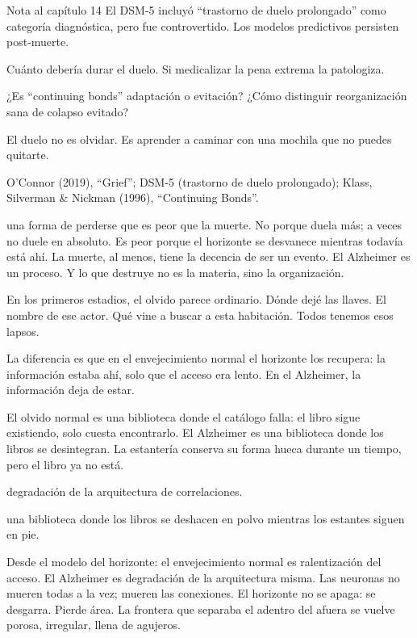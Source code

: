 \begin{notacap}{Nota al capítulo 14}
 El DSM-5 incluyó “trastorno de duelo prolongado” como categoría diagnóstica, pero fue controvertido. Los modelos predictivos persisten post-muerte.

 Cuánto debería durar el duelo. Si medicalizar la pena extrema la patologiza.

 ¿Es “continuing bonds” adaptación o evitación? ¿Cómo distinguir reorganización sana de colapso evitado?

 El duelo no es olvidar. Es aprender a caminar con una mochila que no puedes quitarte.

 O’Connor (2019), “Grief”; DSM-5 (trastorno de duelo prolongado); Klass, Silverman \& Nickman (1996), “Continuing Bonds”.
\end{notacap}
\noindent {} una forma de perderse que es peor que la muerte. No porque duela más; a veces no duele en absoluto. Es peor porque el horizonte se desvanece mientras todavía está ahí. La muerte, al menos, tiene la decencia de ser un evento. El Alzheimer es un proceso. Y lo que destruye no es la materia, sino la organización.

\noindent En los primeros estadios, el olvido parece ordinario. Dónde dejé las llaves. El nombre de ese actor. Qué vine a buscar a esta habitación. Todos tenemos esos lapsos.

La diferencia es que en el envejecimiento normal el horizonte los recupera: la información estaba ahí, solo que el acceso era lento. En el Alzheimer, la información deja de estar.

El olvido normal es una biblioteca donde el catálogo falla: el libro sigue existiendo, solo cuesta encontrarlo. El Alzheimer es una biblioteca donde los libros se desintegran. La estantería conserva su forma hueca durante un tiempo, pero el libro ya no está.

\begin{fisica}
 degradación de la arquitectura de correlaciones.

 una biblioteca donde los libros se deshacen en polvo mientras los estantes siguen en pie.
\end{fisica}
Desde el modelo del horizonte: el envejecimiento normal es ralentización del acceso. El Alzheimer es degradación de la arquitectura misma. Las neuronas no mueren todas a la vez; mueren las conexiones. El horizonte no se apaga: se desgarra. Pierde área. La frontera que separaba el adentro del afuera se vuelve porosa, irregular, llena de agujeros.

